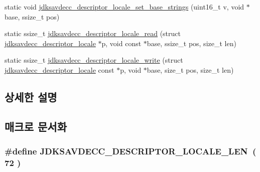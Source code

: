 \begin{DoxyCompactItemize}
\item 
static void \hyperlink{group__descriptor__locale_gaa9eb2847a7bf41b629c7ba5da3f0e072}{jdksavdecc\+\_\+descriptor\+\_\+locale\+\_\+set\+\_\+base\+\_\+strings} (uint16\+\_\+t v, void $\ast$base, ssize\+\_\+t pos)
\item 
static ssize\+\_\+t \hyperlink{group__descriptor__locale_ga37a7f84832ecac0f38537670ec82fc2d}{jdksavdecc\+\_\+descriptor\+\_\+locale\+\_\+read} (struct \hyperlink{structjdksavdecc__descriptor__locale}{jdksavdecc\+\_\+descriptor\+\_\+locale} $\ast$p, void const $\ast$base, ssize\+\_\+t pos, size\+\_\+t len)
\item 
static ssize\+\_\+t \hyperlink{group__descriptor__locale_ga2235183f20105acfbd974c7d1bbfd385}{jdksavdecc\+\_\+descriptor\+\_\+locale\+\_\+write} (struct \hyperlink{structjdksavdecc__descriptor__locale}{jdksavdecc\+\_\+descriptor\+\_\+locale} const $\ast$p, void $\ast$base, size\+\_\+t pos, size\+\_\+t len)
\end{DoxyCompactItemize}


\subsection{상세한 설명}


\subsection{매크로 문서화}
\subsubsection[{\texorpdfstring{J\+D\+K\+S\+A\+V\+D\+E\+C\+C\+\_\+\+D\+E\+S\+C\+R\+I\+P\+T\+O\+R\+\_\+\+L\+O\+C\+A\+L\+E\+\_\+\+L\+EN}{JDKSAVDECC_DESCRIPTOR_LOCALE_LEN}}]{\setlength{\rightskip}{0pt plus 5cm}\#define J\+D\+K\+S\+A\+V\+D\+E\+C\+C\+\_\+\+D\+E\+S\+C\+R\+I\+P\+T\+O\+R\+\_\+\+L\+O\+C\+A\+L\+E\+\_\+\+L\+EN~( 72 )}\hypertarget{group__descriptor__locale_gaa79c61cd4ccd2cc3b8d73d8e8c17b48b}{}\label{group__descriptor__locale_gaa79c61cd4ccd2cc3b8d73d8e8c17b48b}


